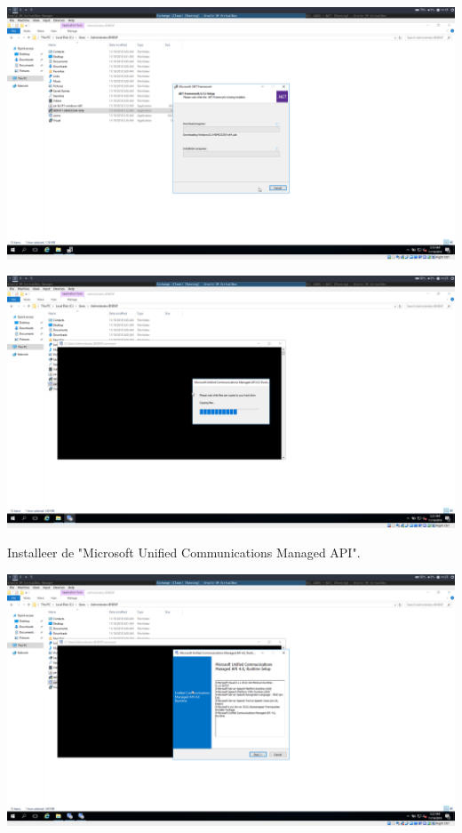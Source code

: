 \documentclass[a4paper]{article}
\begin{document}
	\begin{center}
	\includegraphics[width=15cm]{Pictures/Exchange/Pre/1542633506.png}
\end{center}
	\begin{center}
	\includegraphics[width=15cm]{Pictures/Exchange/Pre/1542633791.png}
	
	Installeer de "Microsoft Unified Communications Managed API".
\end{center}
	\begin{center}
	\includegraphics[width=15cm]{Pictures/Exchange/Pre/1542633810.png}
\end{center}
\end{document}
